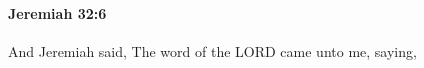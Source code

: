 
		\paragraph{Jeremiah 32:6} %
			\label{JEREMIAH-32-6}

			And Jeremiah said, The word of the LORD came unto me, saying,



